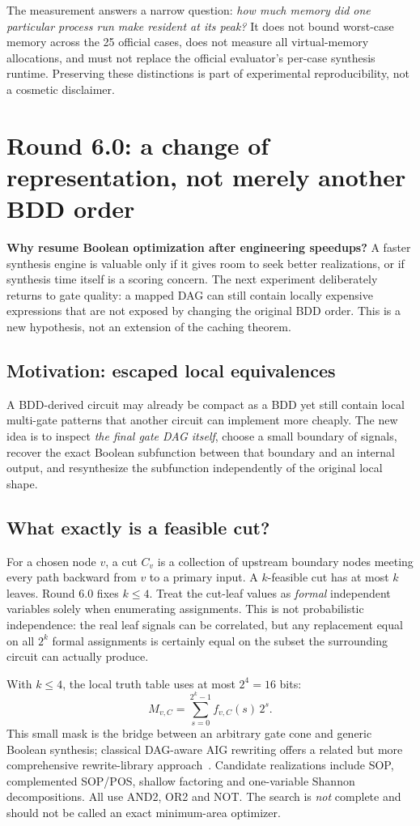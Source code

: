 \documentclass[a4paper,10pt]{article}
\theoremstyle{definition}
\theoremstyle{remark}
\begin{document}
The measurement answers a narrow question: \emph{how much memory did one particular process run make resident at its peak?} It does not bound worst-case memory across the 25 official cases, does not measure all virtual-memory allocations, and must not replace the official evaluator's per-case synthesis runtime. Preserving these distinctions is part of experimental reproducibility, not a cosmetic disclaimer.

\section{Round 6.0: a change of representation, not merely another BDD order}
\textbf{Why resume Boolean optimization after engineering speedups?} A faster synthesis engine is valuable only if it gives room to seek better realizations, or if synthesis time itself is a scoring concern. The next experiment deliberately returns to gate quality: a mapped DAG can still contain locally expensive expressions that are not exposed by changing the original BDD order. This is a new hypothesis, not an extension of the caching theorem.
\subsection{Motivation: escaped local equivalences}
A BDD-derived circuit may already be compact as a BDD yet still contain local multi-gate patterns that another circuit can implement more cheaply. The new idea is to inspect \emph{the final gate DAG itself}, choose a small boundary of signals, recover the exact Boolean subfunction between that boundary and an internal output, and resynthesize the subfunction independently of the original local shape.

\subsection{What exactly is a feasible cut?}
For a chosen node $v$, a cut $C_v$ is a collection of upstream boundary nodes meeting every path backward from $v$ to a primary input. A $k$-feasible cut has at most $k$ leaves. Round 6.0 fixes $k\le4$. Treat the cut-leaf values as \emph{formal} independent variables solely when enumerating assignments. This is not probabilistic independence: the real leaf signals can be correlated, but any replacement equal on all $2^k$ formal assignments is certainly equal on the subset the surrounding circuit can actually produce.

With $k\le4$, the local truth table uses at most $2^4=16$ bits:
\begin{equation}
 M_{v,C}=\sum_{s=0}^{2^k-1}f_{v,C}(s)\,2^s.
\end{equation}
This small mask is the bridge between an arbitrary gate cone and generic Boolean synthesis; classical DAG-aware AIG rewriting offers a related but more comprehensive rewrite-library approach~\cite{mishchenko2006,abc}. Candidate realizations include SOP, complemented SOP/POS, shallow factoring and one-variable Shannon decompositions. All use AND2, OR2 and NOT. The search is \emph{not} complete and should not be called an exact minimum-area optimizer.
\end{document}
